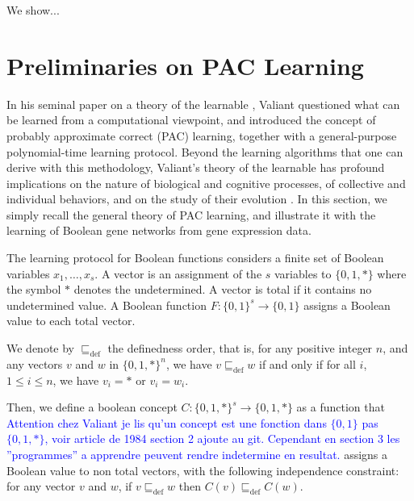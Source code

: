 \documentclass{llncs}
\newcommand{\francois}[1]{\textcolor{blue}{#1}}
\newcommand{\defleq}{\sqsubseteq_{\text{def}}}
\begin{document}
We show...

\section{Preliminaries on PAC Learning}\label{pac}

In his seminal paper on a theory of the learnable \cite{Valiant84cacm},
Valiant questioned what can be learned from a computational viewpoint,
and introduced the concept of probably approximate correct (PAC) learning,
together with a general-purpose polynomial-time learning protocol.
Beyond the learning algorithms that one can derive with this methodology,
Valiant's theory of the learnable has profound implications
on the nature of biological and cognitive processes,
of collective and individual behaviors,
and on the study of their evolution \cite{Valiant13book}.
In this section, we simply recall the general theory of PAC learning,
and illustrate it with the learning of Boolean gene networks from gene expression data.

The learning protocol for Boolean functions considers
a finite set of Boolean variables $x_1,\ldots,x_s$.
A vector is an assignment of the $s$ variables to $\{0,1,*\}$
where the symbol $*$ denotes the undetermined.
A vector is total if it contains no undetermined value.
A Boolean function $F:\{0,1\}^s \rightarrow\{0,1\}$
assigns a Boolean value to each total vector.

We denote by $\defleq$ the definedness order, that is, for any positive integer $n$, and any vectors $v$ and $w$ in $\{0,1,*\}^n$, we have $v \defleq w$ if and only if for all $i$, $1 \leq i \leq n$, we have $v_i = *$ or $v_i = w_i$.

Then, we define a boolean concept $C:\{0,1,*\}^s \rightarrow\{0,1,*\}$ as a function that
\francois{Attention chez Valiant je lis qu'un concept est une fonction dans $\{0,1\}$ pas $\{0,1,*\}$, voir article de 1984 section 2 ajoute au git. Cependant en section 3 les ''programmes'' a apprendre peuvent rendre indetermine en resultat.}
assigns a Boolean value to non total vectors,
with the following independence constraint:
for any vector $v$ and $w$, if $v \defleq w$ then $C(v) \defleq C(w)$.
\end{document}
